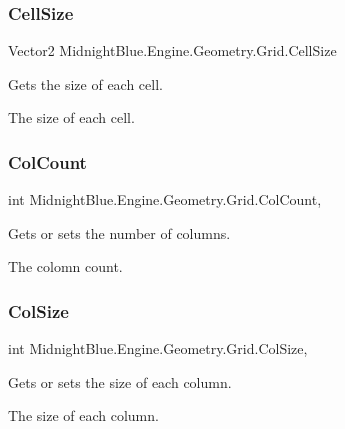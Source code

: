 \subsubsection{\texorpdfstring{Cell\+Size}{CellSize}}
{\footnotesize\ttfamily Vector2 Midnight\+Blue.\+Engine.\+Geometry.\+Grid.\+Cell\+Size\hspace{0.3cm}{\ttfamily [get]}}



Gets the size of each cell. 

The size of each cell.\hypertarget{class_midnight_blue_1_1_engine_1_1_geometry_1_1_grid_acd4c2827f3d18e9f7ac6cb3883a72d58}{}\label{class_midnight_blue_1_1_engine_1_1_geometry_1_1_grid_acd4c2827f3d18e9f7ac6cb3883a72d58} 
\subsubsection{\texorpdfstring{Col\+Count}{ColCount}}
{\footnotesize\ttfamily int Midnight\+Blue.\+Engine.\+Geometry.\+Grid.\+Col\+Count\hspace{0.3cm}{\ttfamily [get]}, {\ttfamily [set]}}



Gets or sets the number of columns. 

The colomn count.\hypertarget{class_midnight_blue_1_1_engine_1_1_geometry_1_1_grid_a95ba1e3a279e45901467c00563dedc07}{}\label{class_midnight_blue_1_1_engine_1_1_geometry_1_1_grid_a95ba1e3a279e45901467c00563dedc07} 
\subsubsection{\texorpdfstring{Col\+Size}{ColSize}}
{\footnotesize\ttfamily int Midnight\+Blue.\+Engine.\+Geometry.\+Grid.\+Col\+Size\hspace{0.3cm}{\ttfamily [get]}, {\ttfamily [set]}}



Gets or sets the size of each column. 

The size of each column.\hypertarget{class_midnight_blue_1_1_engine_1_1_geometry_1_1_grid_af159c49f9f8b70fe5e7ed5779014654c}{}\label{class_midnight_blue_1_1_engine_1_1_geometry_1_1_grid_af159c49f9f8b70fe5e7ed5779014654c} 
